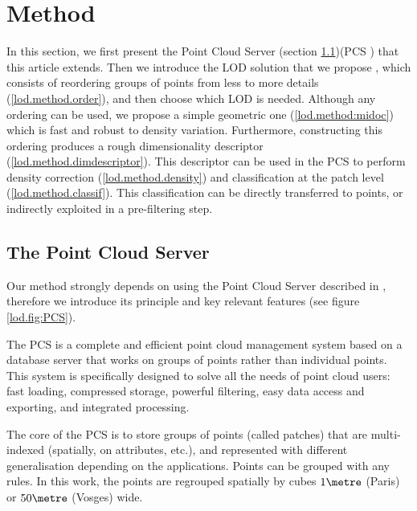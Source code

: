 

\section{Method}
	\label{lod.sec:method}
	
	In this section, we first present the Point Cloud Server (section \ref{lod.method.PCS})(PCS \cite{Cura2015})
	that this article extends. Then we introduce the LOD solution that we propose 
	, which consists of reordering groups of points from less to more details (\ref{lod.method.order}), and then choose which LOD is needed.
	Although any ordering can be used, we propose a simple geometric one (\ref{lod.method:midoc}) which is fast and robust to density variation. 
	Furthermore, constructing this ordering produces a rough dimensionality descriptor (\ref{lod.method.dimdescriptor}). 
	This descriptor can be used in the PCS to perform density correction (\ref{lod.method.density}) and classification at the patch level (\ref{lod.method.classif}). This classification can be directly transferred to points, or indirectly exploited in a pre-filtering step.
	
	\subsection{The Point Cloud Server}
	\label{lod.method.PCS}
		
		Our method strongly depends on using the Point Cloud Server described in \cite{Cura2015},
		therefore we introduce its principle and key relevant features (see figure \ref{lod.fig:PCS}).
		
		The PCS is a complete and efficient point cloud management system based on a database server that works on groups of points rather than individual points.
		This system is specifically designed to solve all the needs of point cloud users:
		fast loading, compressed storage, powerful filtering, easy data access and exporting, and integrated processing.
		
		The core of the PCS is to store groups of points (called patches) that are multi-indexed (spatially, on attributes, etc.), and represented with different generalisation depending on the applications.
		Points can be grouped with any rules.
		In this work, the points are regrouped spatially by cubes $1 \metre$ (Paris) or $50 \metre$ (Vosges) wide.
		
